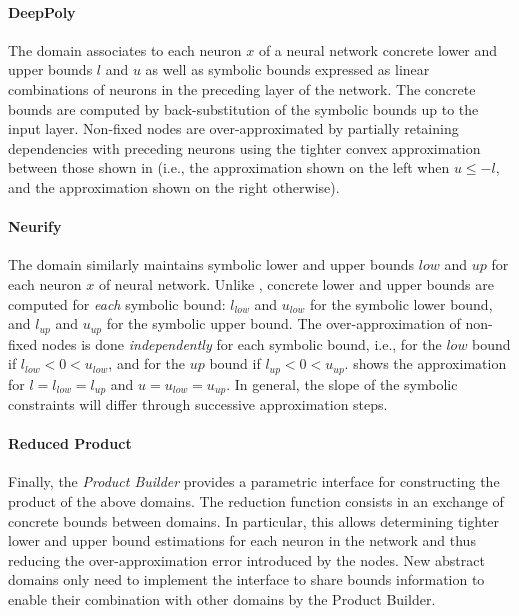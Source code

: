\paragraph{DeepPoly}

The \deeppoly{} domain  associates to each neuron $x$ of a neural network concrete lower and upper bounds $l$ and $u$ as well as symbolic bounds expressed as linear combinations of neurons in the preceding layer of the network.
%
The concrete bounds are computed by back-substitution of the symbolic bounds up to the input layer. Non-fixed \relu{} nodes are over-approximated by partially retaining dependencies with preceding neurons using the tighter convex approximation between those shown in  (i.e., the approximation shown on the left when $u \leq -l$, and the approximation shown on the right otherwise).

\paragraph{Neurify}

The \neurify{} domain  similarly maintains symbolic lower and upper bounds $low$ and $up$ for each neuron $x$ of neural network. Unlike \deeppoly, concrete lower and upper bounds are computed for \emph{each} symbolic bound: $l_{low}$ and $u_{low}$ for the symbolic lower bound, and $l_{up}$ and $u_{up}$ for the symbolic upper bound.
%
The over-approximation of non-fixed \relu{} nodes is done \emph{independently} for each symbolic bound, i.e., for the $low$ bound if $l_{low} < 0 < u_{low}$, and for the $up$ bound if $l_{up} < 0 < u_{up}$.
%
 shows the approximation for $l = l_{low} = l_{up}$ and $u = u_{low} = u_{up}$. In general, the slope of the symbolic constraints will differ through successive approximation steps.

\paragraph{Reduced Product}

Finally, the \emph{Product Builder}  provides a parametric interface for constructing the product of the above domains.
The reduction function consists in an exchange of concrete bounds between domains. In particular, this allows determining tighter lower and upper bound estimations for each neuron in the network and thus reducing the over-approximation error introduced by the \relu{} nodes.
New abstract domains only need to implement the interface to share bounds information to enable their combination with other domains by the Product Builder.


